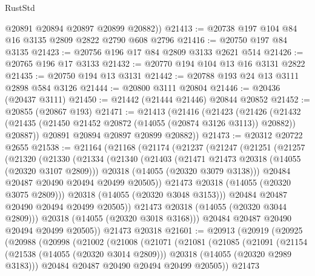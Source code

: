 \begin{lexlean}{RustStd}
\begin{coremodule}
        @20891
        @20894
        @20897
        @20899
        @20882))
@21413 := @20738 @197 @104 @84 @16 @3135 @2809 @2822 @2790 @608 @2796
@21416 := @20750 @197 @84 @3135
@21423 := @20756 @196 @17 @84 @2809 @3133 @2621 @514
@21426 := @20765 @196 @17 @3133
@21432 := @20770 @194 @104 @13 @16 @3131 @2822
@21435 := @20750 @194 @13 @3131
@21442 := @20788 @193 @24 @13 @3111 @2898 @584 @3126
@21444 := @20800 @3111 @20804
@21446 := @20436 (@20437 @3111)
@21450 := @21442 (@21444 @21446) @20844 @20852
@21452 := @20855 (@20867 @193)
@21471 := @21413
    (@21416
      (@21423
        (@21426
          (@21432 (@21435 (@21450 @21452 @20872 (@14055 (@20874 @3126 @3113)) @20882)) @20887))
        @20891
        @20894
        @20897
        @20899
        @20882))
@21473 := @20312 @20722 @2655
@21538 := @21164
    (@21168
      (@21174
        (@21237
          (@21247
            (@21251
              (@21257
                (@21320
                  (@21330
                    (@21334
                      (@21340
                        (@21403
                          (@21471 @21473 @20318 (@14055 (@20320 @3107 @2809)))
                          @20318
                          (@14055 (@20320 @3079 @3138)))
                        @20484
                        @20487
                        @20490
                        @20494
                        @20499
                        @20505))
                    @21473
                    @20318
                    (@14055 (@20320 @3075 @2809)))
                  @20318
                  (@14055 (@20320 @3048 @3153)))
                @20484
                @20487
                @20490
                @20494
                @20499
                @20505))
            @21473
            @20318
            (@14055 (@20320 @3044 @2809)))
          @20318
          (@14055 (@20320 @3018 @3168)))
        @20484
        @20487
        @20490
        @20494
        @20499
        @20505))
    @21473
    @20318
@21601 := @20913
    (@20919
      (@20925
        (@20988
          (@20998
            (@21002
              (@21008
                (@21071
                  (@21081
                    (@21085
                      (@21091
                        (@21154
                          (@21538 (@14055 (@20320 @3014 @2809)))
                          @20318
                          (@14055 (@20320 @2989 @3183)))
                        @20484
                        @20487
                        @20490
                        @20494
                        @20499
                        @20505))
                    @21473

\end{coremodule}
\end{lexlean}
